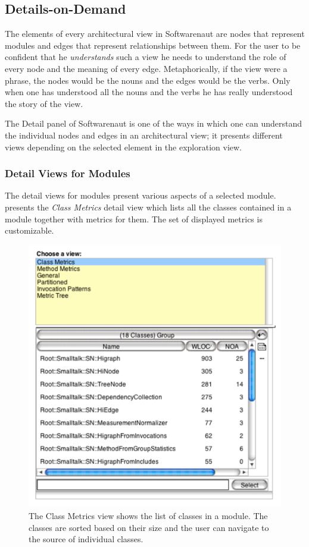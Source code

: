 \documentclass[preprint,12pt]{elsarticle}
\begin{document}
\newpage
\subsection {Details-on-Demand}


The elements of every architectural view in Softwarenaut are nodes that represent modules and edges that represent relationships between them. For the user to be confident that he {\em understands} such a view he needs to understand the role of every node and the meaning of every edge. Metaphorically, if the view were a phrase, the nodes would be the nouns and the edges would be the verbs. Only when one has understood all the nouns and the verbs he has really understood the story of the view.  

The Detail panel of Softwarenaut is one of the ways in which one can understand the individual nodes and edges in an architectural view; it presents different views depending on the selected element in the exploration view. %



\subsubsection {Detail Views for Modules}
The detail views for modules present various aspects of a selected module. 
 presents the {\em Class Metrics} detail view which lists all the classes contained in a module together with metrics for them. The set of displayed metrics is customizable. %

\begin{figure}[h]
\begin{center}
\includegraphics[width=0.54\linewidth]{DetailForNode}
\caption{The Class Metrics view shows the list of classes in a module. The classes are sorted based on their size and the user can navigate to the source of individual classes.}

\end{center}
\end{figure}
\end{document}
